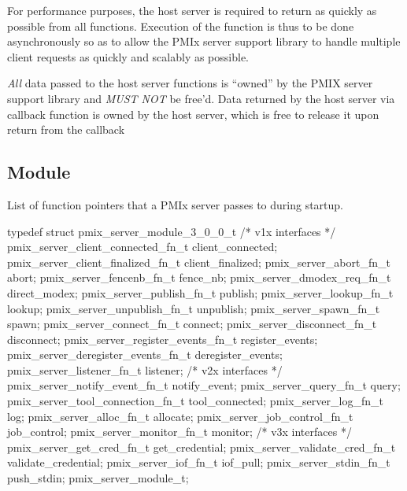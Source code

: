 \advicermstart
For performance purposes, the host server is required to return as quickly as possible from all functions. Execution of
the function is thus to be done asynchronously so as to allow the \ac{PMIx} server support library to handle multiple client requests
as quickly and scalably as possible.

\textit{All} data passed to the host server functions is ``owned'' by the
PMIX server support library and \textit{MUST NOT} be free'd. Data returned
by the host server via callback function is owned by the host
server, which is free to release it upon return from the callback
\advicermend

\subsection{ Module}

\summary

List of function pointers that a PMIx server passes to  during startup.

\format

\cspecificstart
\begin{codepar}
typedef struct pmix_server_module_3_0_0_t {
    /* v1x interfaces */
    pmix_server_client_connected_fn_t   client_connected;
    pmix_server_client_finalized_fn_t   client_finalized;
    pmix_server_abort_fn_t              abort;
    pmix_server_fencenb_fn_t            fence_nb;
    pmix_server_dmodex_req_fn_t         direct_modex;
    pmix_server_publish_fn_t            publish;
    pmix_server_lookup_fn_t             lookup;
    pmix_server_unpublish_fn_t          unpublish;
    pmix_server_spawn_fn_t              spawn;
    pmix_server_connect_fn_t            connect;
    pmix_server_disconnect_fn_t         disconnect;
    pmix_server_register_events_fn_t    register_events;
    pmix_server_deregister_events_fn_t  deregister_events;
    pmix_server_listener_fn_t           listener;
    /* v2x interfaces */
    pmix_server_notify_event_fn_t       notify_event;
    pmix_server_query_fn_t              query;
    pmix_server_tool_connection_fn_t    tool_connected;
    pmix_server_log_fn_t                log;
    pmix_server_alloc_fn_t              allocate;
    pmix_server_job_control_fn_t        job_control;
    pmix_server_monitor_fn_t            monitor;
    /* v3x interfaces */
    pmix_server_get_cred_fn_t           get_credential;
    pmix_server_validate_cred_fn_t      validate_credential;
    pmix_server_iof_fn_t                iof_pull;
    pmix_server_stdin_fn_t              push_stdin;
} pmix_server_module_t;
\end{codepar}
\cspecificend


